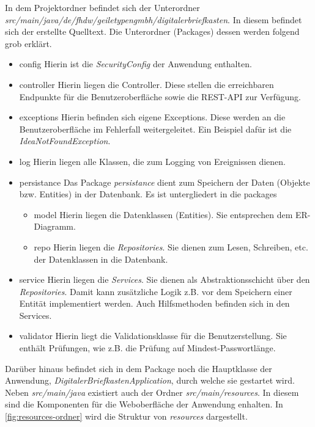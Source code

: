 In dem Projektordner befindet sich der Unterordner \textit{src/main/java/de/fhdw/geiletypengmbh/digitalerbriefkasten}. In diesem
befindet sich der erstellte Quelltext. Die Unterordner (Packages) dessen werden folgend grob erklärt.
\begin{itemize}
    \item config
    \subitem Hierin ist die \textit{SecurityConfig} der Anwendung enthalten.
    \item controller
    \subitem Hierin liegen die Controller. Diese stellen die erreichbaren Endpunkte für die Benutzeroberfläche sowie die REST-API zur Verfügung.
    \item exceptions
    \subitem Hierin befinden sich eigene Exceptions. Diese werden an die Benutzeroberfläche im Fehlerfall weitergeleitet. Ein Beispiel dafür ist die \textit{IdeaNotFoundException}.
    \item log
    \subitem Hierin liegen alle Klassen, die zum Logging von Ereignissen dienen.
    \item persistance
    \subitem Das Package \textit{persistance} dient zum Speichern der Daten (Objekte bzw. Entities) in der Datenbank. Es ist untergliedert
    in die packages
    \begin{itemize}
        \item model
        \subitem Hierin liegen die Datenklassen (Entities). Sie entsprechen dem ER-Diagramm.
        \item repo
        \subitem Hierin liegen die \textit{Repositories}. Sie dienen zum Lesen, Schreiben, etc. der Datenklassen in die Datenbank.
    \end{itemize}
    \item service
    \subitem Hierin liegen die \textit{Services}. Sie dienen als Abstraktionsschicht über den \textit{Repositories}. Damit kann zusätzliche Logik z.B. vor dem Speichern einer Entität implementiert werden. Auch Hilfsmethoden befinden sich in den Services.
    \item validator
    \subitem Hierin liegt die Validationsklasse für die Benutzerstellung. Sie enthält Prüfungen, wie z.B. die Prüfung auf Mindest-Passwortlänge.
\end{itemize}
Darüber hinaus befindet sich in dem Package noch die Hauptklasse der Anwendung, \textit{DigitalerBriefkastenApplication}, durch welche sie gestartet wird.
\newline
Neben \textit{src/main/java} existiert auch der Ordner \textit{src/main/resources}. In diesem sind die Komponenten für die Weboberfläche der Anwendung enhalten.
In \cref{fig:resources-ordner} wird die Struktur von \textit{resources} dargestellt.

